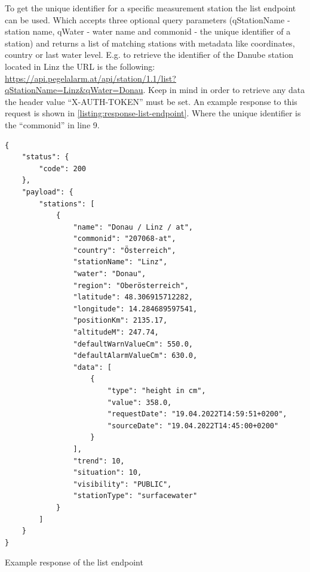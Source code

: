 To get the unique identifier for a specific measurement station the list endpoint can be used. Which accepts three optional query parameters (qStationName - station name, qWater - water name and commonid - the unique identifier of a station) and returns a list of matching stations with metadata like coordinates, country or last water level. E.g. to retrieve the identifier of the Danube station located in Linz the URL is the following: \url{https://api.pegelalarm.at/api/station/1.1/list?qStationName=Linz&qWater=Donau}. Keep in mind in order to retrieve any data the header value ``X-AUTH-TOKEN'' must be set. An example response to this request is shown in \autoref{listing:response-list-endpoint}. Where the unique identifier is the ``commonid'' in line 9.
\begin{listing}
\begin{verbatim}
{
    "status": {
        "code": 200
    },
    "payload": {
        "stations": [
            {
                "name": "Donau / Linz / at",
                "commonid": "207068-at",
                "country": "Österreich",
                "stationName": "Linz",
                "water": "Donau",
                "region": "Oberösterreich",
                "latitude": 48.306915712282,
                "longitude": 14.284689597541,
                "positionKm": 2135.17,
                "altitudeM": 247.74,
                "defaultWarnValueCm": 550.0,
                "defaultAlarmValueCm": 630.0,
                "data": [
                    {
                        "type": "height in cm",
                        "value": 358.0,
                        "requestDate": "19.04.2022T14:59:51+0200",
                        "sourceDate": "19.04.2022T14:45:00+0200"
                    }
                ],
                "trend": 10,
                "situation": 10,
                "visibility": "PUBLIC",
                "stationType": "surfacewater"
            }
        ]
    }
}
\end{verbatim}
\caption{Example response of the list endpoint}
\label{listing:response-list-endpoint}
\end{listing}

